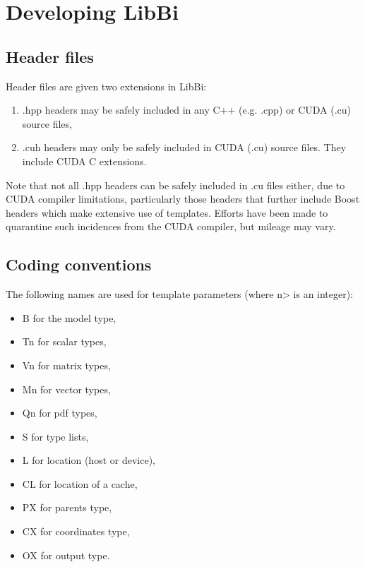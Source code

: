 \section{Developing LibBi}

\subsection{Header files}

Header files are given two extensions in LibBi:
\begin{enumerate}
\item {\sf *.hpp} headers may be safely included in any C++ (e.g.
{\sf *.cpp}) or CUDA ({\sf *.cu}) source files,
\item {\sf *.cuh} headers may only be safely included in CUDA ({\sf *.cu})
source files. They include CUDA C extensions.
\end{enumerate}

Note that not all {\sf *.hpp} headers can be safely included in {\sf *.cu}
files either, due to CUDA compiler limitations, particularly those headers
that further include Boost headers which make extensive use of
templates. Efforts have been made to quarantine such incidences from the CUDA
compiler, but mileage may vary.

\subsection{Coding conventions}

The following names are used for template parameters (where {\sf n}>
is an integer):
\begin{itemize}
\item {\sf B} for the model type,
\item {\sf Tn} for scalar types,
\item {\sf Vn} for matrix types,
\item {\sf Mn} for vector types,
\item {\sf Qn} for pdf types,
\item {\sf S} for type lists,
\item {\sf L} for location (host or device),
\item {\sf CL} for location of a cache,
\item {\sf PX} for parents type,
\item {\sf CX} for coordinates type,
\item {\sf OX} for output type.
\end{itemize}

